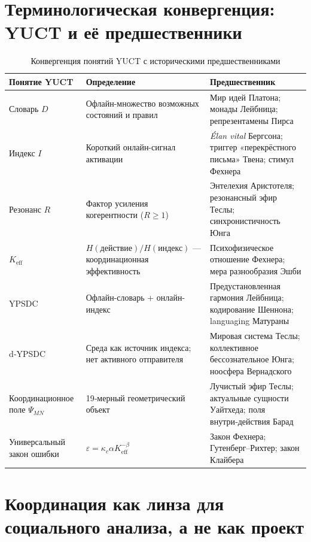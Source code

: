 \documentclass[12pt,a4paper]{article}
\begin{document}
	\section{Терминологическая конвергенция: YUCT и её предшественники}
	
	\begin{table}[htbp]
		\centering
		\caption{Конвергенция понятий YUCT с историческими предшественниками}
		\label{tab:convergence}
		\small
		\begin{tabular}{p{3.0cm}p{4.5cm}p{6.5cm}}
			\toprule
			\textbf{Понятие YUCT} & \textbf{Определение} & \textbf{Предшественник} \\
			\midrule
			Словарь \(D\) & Офлайн-множество возможных состояний и правил & Мир идей Платона; монады Лейбница; репрезентамены Пирса \\
			Индекс \(I\) & Короткий онлайн-сигнал активации & \emph{Élan vital} Бергсона; триггер «перекрёстного письма» Твена; стимул Фехнера \\
			Резонанс \(R\) & Фактор усиления когерентности (\(R \ge 1\)) & Энтелехия Аристотеля; резонансный эфир Теслы; синхронистичность Юнга \\
			\(K_{\mathrm{eff}}\) & \(H(\text{действие})/H(\text{индекс})\) — координационная эффективность & Психофизическое отношение Фехнера; мера разнообразия Эшби \\
			YPSDC & Офлайн-словарь + онлайн-индекс & Предустановленная гармония Лейбница; кодирование Шеннона; languaging Матураны \\
			d‑YPSDC & Среда как источник индекса; нет активного отправителя & Мировая система Теслы; коллективное бессознательное Юнга; ноосфера Вернадского \\
			Координационное поле \(\Psi_{MN}\) & 19‑мерный геометрический объект & Лучистый эфир Теслы; актуальные сущности Уайтхеда; поля внутри‑действия Барад \\
			Универсальный закон ошибки & \(\varepsilon = \kappa_c \alpha K_{\mathrm{eff}}^{-\beta}\) & Закон Фехнера; Гутенберг–Рихтер; закон Клайбера \\
			\bottomrule
		\end{tabular}
	\end{table}
	
	\section{Координация как линза для социального анализа, а не как проект}
	\label{sec:social-lens}
	
\end{document}
